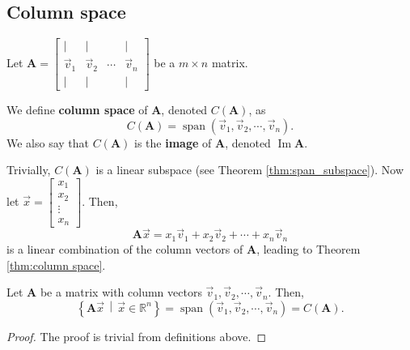 \documentclass[]{book}
\DeclareMathOperator{\vecspan}{span}
\DeclareMathOperator{\image}{Im}
\newcommand{\vecxxdx}[1][x]{\ensuremath{\begin{bmatrix}
#1_1 \\
#1_2 \\
\vdots \\
#1_n
\end{bmatrix}}}
\newcommand{\vecn}[1]{\ensuremath{\vec{v}_{#1}}}
\newcommand{\suchthat}{\,\middle|\,}
\newcommand{\mat}[1]{\ensuremath{\mathbf{#1}}}
\newcommand{\cmat}[1][v]{\begin{bmatrix}
        \vert & \vert & & \vert \\
        \vec{#1}_1 & \vec{#1}_2 & \cdots & \vec{#1}_n \\
        \vert & \vert & & \vert
    \end{bmatrix}
}
\begin{document}
\subsection{Column space}
Let $\mat{A}=\cmat$ be a $m \times n$ matrix.
\begin{definition}
    We define \textbf{column space} of $\mat{A}$, denoted $C(\mat{A})$, as
    \[C(\mat{A}) = \vecspan\left(\vecn{1}, \vecn{2}, \cdots, \vecn{n}\right).\] We also say that $C(\mat{A})$ is the \textbf{image} of $\mat{A}$, denoted $\image\mat{A}$.
\end{definition}
Trivially, $C(\mat{A})$ is a linear subspace (see Theorem \ref{thm:span_subspace}). Now let $\vec{x} = \vecxxdx$. Then,
\[\mat{A} \vec{x} = x_1\vecn{1} + x_2\vecn{2} + \cdots + x_n\vecn{n}\]
is a linear combination of the column vectors of $\mat{A}$, leading to Theorem \ref{thm:column space}.
\begin{theorem}
    \label{thm:column space}
    Let $\mat{A}$ be a matrix with column vectors $\vecn{1}, \vecn{2}, \cdots, \vecn{n}$. Then,
    \[
    \left\{\mat{A}\vec{x} \suchthat \vec{x} \in \mathbb{R}^n\right\} = \vecspan\left(\vecn{1}, \vecn{2}, \cdots, \vecn{n}\right) 
    = C(\mat{A}).\]

\begin{proof}
    The proof is trivial from definitions above.
\end{proof}
\end{theorem}
\end{document}
